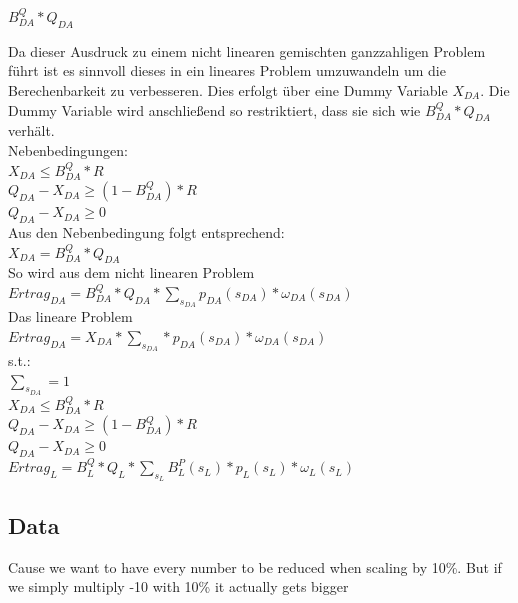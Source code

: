     $B^Q_{DA} * Q_{DA}$ 

Da dieser Ausdruck zu einem nicht linearen gemischten ganzzahligen Problem führt ist es sinnvoll dieses in ein lineares Problem umzuwandeln  um die Berechenbarkeit zu verbesseren.
Dies erfolgt über eine Dummy Variable $X_{DA}$. Die Dummy Variable wird anschließend so restriktiert, dass sie sich wie $B^Q_{DA} * Q_{DA}$ verhält.
\\
Nebenbedingungen:\\
$X_{DA} \leq B^Q_{DA} * R$\\
$Q_{DA} - X_{DA} \geq (1 - B^Q_{DA}) * R$\\
$Q_{DA} - X_{DA} \geq 0 $\\
Aus den Nebenbedingung folgt entsprechend:\\
$X_{DA} = B^Q_{DA} * Q_{DA}$\\

So wird aus dem nicht linearen Problem\\
$Ertrag_{DA} = B^Q_{DA} * Q_{DA} * \sum_{s_{DA}}  p_{DA}(s_{DA}) * \omega_{DA}(s_{DA})  $\\
Das lineare Problem\\
$Ertrag_{DA} = X_{DA} * \sum_{s_{DA}} * p_{DA}(s_{DA}) * \omega_{DA}(s_{DA})  $\\
s.t.:\\
$\sum_{s_{DA}} = 1$\\
$X_{DA} \leq B^Q_{DA} * R$\\
$Q_{DA} - X_{DA} \geq (1 - B^Q_{DA}) * R$\\
$Q_{DA} - X_{DA} \geq 0 $\\


$Ertrag_{L} = B^Q_{L} * Q_{L} * \sum_{s_{L}} B^P_{L}(s_{L}) * p_{L}(s_{L}) * \omega_{L}(s_{L})  $\\ 


\subsection{Data}
Cause we want to have every number to be reduced when scaling by 10\%.
But if we simply multiply -10 with 10\% it actually gets bigger